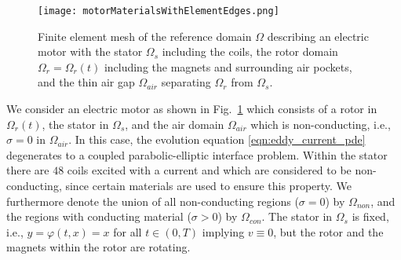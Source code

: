 \documentclass[12pt]{article}
\numberwithin{equation}{section}
\begin{document}
\begin{figure}[ht]
\begin{center}
\texttt{[image: motorMaterialsWithElementEdges.png]}
\end{center}
\caption{Finite element mesh of the reference domain $\Omega$ describing 
an electric motor with the
stator $\Omega_s$ including the coils, the rotor domain $\Omega_r=\Omega_r(t)$
including the magnets and surrounding air pockets, and the thin air gap $\Omega_{air}$ separating $\Omega_r$ from $\Omega_s$.}
\label{Bild Motor}
\end{figure}

We consider an electric motor as shown in Fig.~\ref{Bild Motor} which
consists of a rotor in $\Omega_r(t)$, the stator in $\Omega_s$, and the
air domain $\Omega_{air}$ which is non-conducting, i.e.,
$\sigma = 0$ in $\Omega_{air}$. In this case, the evolution equation
\eqref{eqn:eddy_current_pde} degenerates to a coupled parabolic-elliptic
interface problem. Within the stator there are $48$ coils excited with a
current and which are considered to be non-conducting, since certain
materials are used to ensure this property. We furthermore denote the
union of all non-conducting
regions ($\sigma = 0$) by $\Omega_{non}$, and the regions with conducting material ($\sigma > 0$) by
$\Omega_{con}$. The stator in $\Omega_s$ is
fixed, i.e., $y= \varphi(t,x)=x$ for all $t \in (0,T)$ implying $v \equiv 0$,
but the rotor and the magnets within the rotor are rotating.
\end{document}
